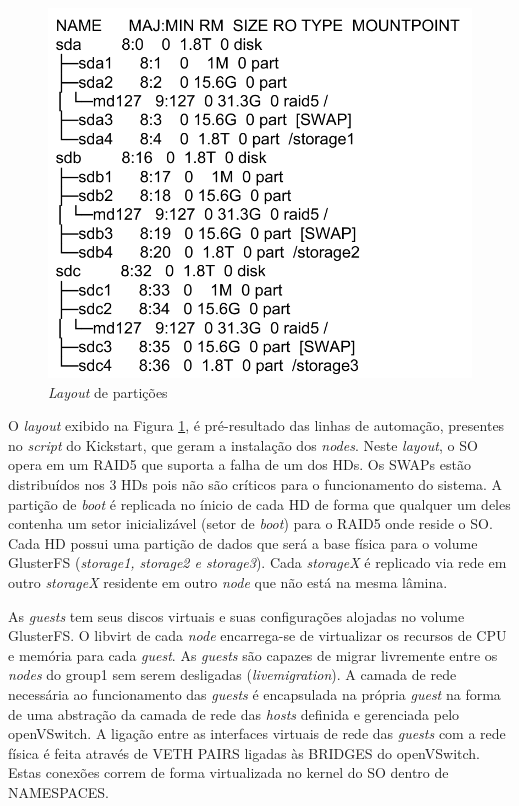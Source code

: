     \begin{figure}[htb]
    \centering
    \includegraphics[scale=0.8]{imagens/particoes.pdf}
    \caption{\textit{Layout} de partições}
    \label{fig:particoes}
    \end{figure}

O \textit{layout} exibido na Figura \ref{fig:particoes}, é pré-resultado das linhas de automação, presentes no \textit{script} do Kickstart, que geram a instalação dos \textit{nodes}.
Neste \textit{layout}, o SO opera em um RAID5 que suporta a falha de um dos HDs. Os SWAPs estão distribuídos nos 3 HDs pois não são críticos para o funcionamento do sistema. A partição de \textit{boot} é replicada no ínicio de cada HD de forma que qualquer um deles contenha um setor inicializável (setor de \textit{boot}) para o RAID5 onde reside o SO. Cada HD possui uma partição de dados que será a base física para o volume GlusterFS (\textit{storage1, storage2 e storage3}). Cada \textit{storageX} é replicado via rede em outro \textit{storageX} residente em outro \textit{node} que não está na mesma lâmina. 



As \textit{guests} tem seus discos virtuais e suas configurações alojadas no volume GlusterFS. O libvirt de cada \textit{node} encarrega-se de virtualizar os recursos de CPU e memória para cada \textit{guest}. As \textit{guests} são capazes de migrar livremente entre os \textit{nodes} do group1 sem serem desligadas (\textit{livemigration}). A camada de rede necessária ao funcionamento das \textit{guests} é encapsulada na própria \textit{guest} na forma de uma abstração da camada de rede das \textit{hosts} definida e gerenciada pelo openVSwitch. A ligação entre as interfaces virtuais de rede das \textit{guests} com a rede física é feita através de VETH PAIRS ligadas às BRIDGES do openVSwitch. Estas conexões correm de forma virtualizada no kernel do SO dentro de NAMESPACES.

